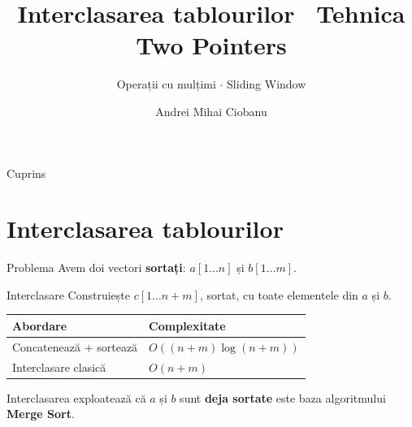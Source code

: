 ﻿\documentclass{beamer}
\title{Interclasarea tablourilor \textbar\ Tehnica Two Pointers}
\subtitle{Operații cu mulțimi $\cdot$ Sliding Window}
\author{Andrei Mihai Ciobanu}
\institute{Algolymp Summer School}
\date{}
\begin{document}
\begin{frame}[shrink]
  \titlepage
\end{frame}

\begin{frame}{Cuprins}
  \tableofcontents
\end{frame}

\section{Interclasarea tablourilor}

\begin{frame}{Problema}
  Avem doi vectori \textbf{sortați}: $a[1 \ldots n]$ și $b[1 \ldots m]$.

  \begin{block}{Interclasare}
    Construiește $c[1 \ldots n{+}m]$, sortat, cu toate elementele din $a$ și $b$.
  \end{block}

  \smallskip
  \begin{center}
  \begin{tabular}{ll}
    \toprule
    Abordare & Complexitate \\
    \midrule
    Concatenează $+$ sortează & $O((n+m)\log(n+m))$ \\
    Interclasare clasică & $O(n+m)$ \\
    \bottomrule
  \end{tabular}
  \end{center}

  \smallskip
  Interclasarea exploatează că $a$ și $b$ sunt \textbf{deja sortate} \textemdash{}
  este baza algoritmului \textbf{Merge Sort}.
\end{frame}
\end{document}
